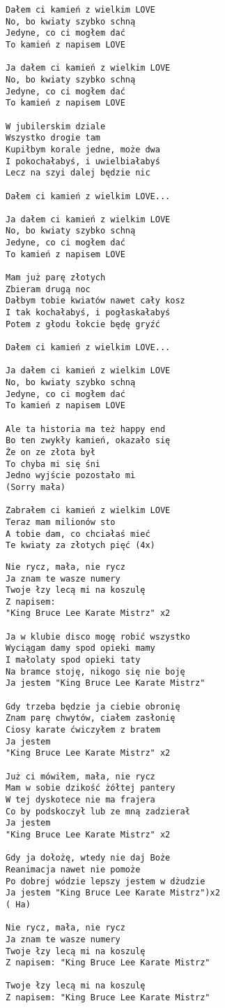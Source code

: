 \documentclass[12pt]{article}
\begin{document}
\begin{verbatim}
Dałem ci kamień z wielkim LOVE
No, bo kwiaty szybko schną
Jedyne, co ci mogłem dać
To kamień z napisem LOVE

Ja dałem ci kamień z wielkim LOVE
No, bo kwiaty szybko schną
Jedyne, co ci mogłem dać
To kamień z napisem LOVE

W jubilerskim dziale
Wszystko drogie tam
Kupiłbym korale jedne, może dwa
I pokochałabyś, i uwielbiałabyś
Lecz na szyi dalej będzie nic

Dałem ci kamień z wielkim LOVE...

Ja dałem ci kamień z wielkim LOVE
No, bo kwiaty szybko schną
Jedyne, co ci mogłem dać
To kamień z napisem LOVE

Mam już parę złotych
Zbieram drugą noc
Dałbym tobie kwiatów nawet cały kosz
I tak kochałabyś, i pogłaskałabyś
Potem z głodu łokcie będę gryźć

Dałem ci kamień z wielkim LOVE...

Ja dałem ci kamień z wielkim LOVE
No, bo kwiaty szybko schną
Jedyne, co ci mogłem dać
To kamień z napisem LOVE

Ale ta historia ma też happy end
Bo ten zwykły kamień, okazało się
Że on ze złota był
To chyba mi się śni
Jedno wyjście pozostało mi
(Sorry mała)

Zabrałem ci kamień z wielkim LOVE
Teraz mam milionów sto
A tobie dam, co chciałaś mieć
Te kwiaty za złotych pięć (4x)
\end{verbatim}
\clearpage

\begin{verbatim}
Nie rycz, mała, nie rycz
Ja znam te wasze numery
Twoje łzy lecą mi na koszulę
Z napisem:
"King Bruce Lee Karate Mistrz" x2

Ja w klubie disco mogę robić wszystko
Wyciągam damy spod opieki mamy
I małolaty spod opieki taty
Na bramce stoję, nikogo się nie boję
Ja jestem "King Bruce Lee Karate Mistrz"

Gdy trzeba będzie ja ciebie obronię
Znam parę chwytów, ciałem zasłonię
Ciosy karate ćwiczyłem z bratem
Ja jestem
"King Bruce Lee Karate Mistrz" x2

Już ci mówiłem, mała, nie rycz
Mam w sobie dzikość żółtej pantery
W tej dyskotece nie ma frajera
Co by podskoczył lub ze mną zadzierał
Ja jestem
"King Bruce Lee Karate Mistrz" x2

Gdy ja dołożę, wtedy nie daj Boże
Reanimacja nawet nie pomoże
Po dobrej wódzie lepszy jestem w dżudzie
Ja jestem "King Bruce Lee Karate Mistrz")x2
( Ha)

Nie rycz, mała, nie rycz
Ja znam te wasze numery
Twoje łzy lecą mi na koszulę
Z napisem: "King Bruce Lee Karate Mistrz"

Twoje łzy lecą mi na koszulę
Z napisem: "King Bruce Lee Karate Mistrz"
\end{verbatim}
\clearpage
\end{document}
